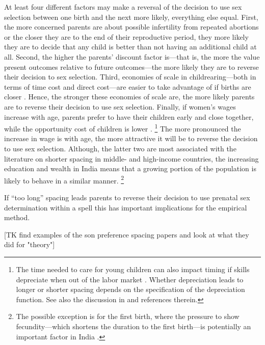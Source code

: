 \documentclass[12pt,letterpaper]{article}
\begin{document}
At least four different factors may make a reversal of the decision 
to use sex selection between one birth and the next more likely, 
everything else equal.
First, the more concerned parents are about possible infertility 
from repeated abortions or the closer they are to the end of their 
reproductive period, they more likely they are to decide that any 
child is better than not having an additional child at all.
Second, the higher the parents' discount factor is---that is, the
more the value present outcomes relative to future outcomes---the
more likely they are to reverse their decision to sex selection.
Third, economies of scale in childrearing---both in terms of time cost 
and direct cost---are easier to take advantage of if births 
are closer \citep[p 947]{Newman1984}.
Hence, the stronger these economies of scale are, the more likely
parents are to reverse their decision to use sex selection.
Finally, if women's wages increase with age, parents prefer
to have their children early and close together, while 
the opportunity cost of children is lower \citep{Heckman1976}.%
\footnote{
The time needed to care for young children can also impact 
timing if skills depreciate when out of the labor market \citep{Happel1984}.
Whether depreciation leads to longer or shorter spacing depends
on the specification of the depreciation function.
See also the discussion in \citet[p 315]{Hotz1997}
and references therein.
}
The more pronounced the increase in wage is with age, the more 
attractive it will be to reverse the decision to use sex selection.
Although, the latter two are most associated with the literature
on shorter spacing in middle- and  high-income countries, 
the increasing education and wealth in India means that a growing 
portion of the population is likely to behave in a similar manner.%
\footnote{
The possible exception is for the first birth, where the pressure to show 
fecundity---which shortens the duration to the first birth---is potentially 
an important factor in India \citep{dyson83,Sethuraman2007,Dommaraju2009}.
}



If ``too long'' spacing leads parents to reverse their decision to use
prenatal sex determination within a spell this has important implications 
for the empirical method.






[TK find examples of the son preference spacing papers and look at what they did
for "theory"]
\end{document}
